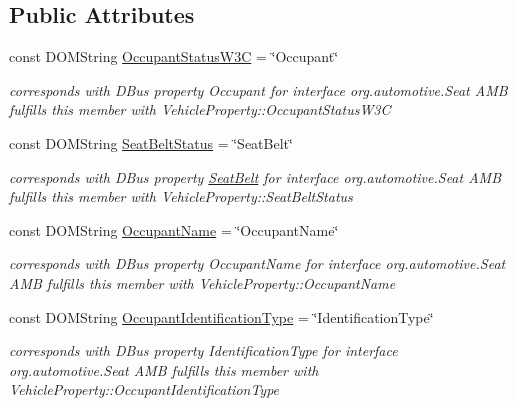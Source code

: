 \subsection*{Public Attributes}
\begin{DoxyCompactItemize}
\item 
\hypertarget{interfaceSeat_a9dfd71204222c0d59de76716120bff44}{const D\+O\+M\+String \hyperlink{interfaceSeat_a9dfd71204222c0d59de76716120bff44}{Occupant\+Status\+W3\+C} = \char`\"{}Occupant\char`\"{}}\label{interfaceSeat_a9dfd71204222c0d59de76716120bff44}

\begin{DoxyCompactList}\small\item\em corresponds with D\+Bus property Occupant for interface org.\+automotive.\+Seat A\+M\+B fulfills this member with Vehicle\+Property\+::\+Occupant\+Status\+W3\+C \end{DoxyCompactList}\item 
\hypertarget{interfaceSeat_a4ad0b531d1d20e3490f67ff56792a701}{const D\+O\+M\+String \hyperlink{interfaceSeat_a4ad0b531d1d20e3490f67ff56792a701}{Seat\+Belt\+Status} = \char`\"{}Seat\+Belt\char`\"{}}\label{interfaceSeat_a4ad0b531d1d20e3490f67ff56792a701}

\begin{DoxyCompactList}\small\item\em corresponds with D\+Bus property \hyperlink{interfaceSeatBelt}{Seat\+Belt} for interface org.\+automotive.\+Seat A\+M\+B fulfills this member with Vehicle\+Property\+::\+Seat\+Belt\+Status \end{DoxyCompactList}\item 
\hypertarget{interfaceSeat_afa5739cd2f418bbc28fa6a469706c8fa}{const D\+O\+M\+String \hyperlink{interfaceSeat_afa5739cd2f418bbc28fa6a469706c8fa}{Occupant\+Name} = \char`\"{}Occupant\+Name\char`\"{}}\label{interfaceSeat_afa5739cd2f418bbc28fa6a469706c8fa}

\begin{DoxyCompactList}\small\item\em corresponds with D\+Bus property Occupant\+Name for interface org.\+automotive.\+Seat A\+M\+B fulfills this member with Vehicle\+Property\+::\+Occupant\+Name \end{DoxyCompactList}\item 
\hypertarget{interfaceSeat_aac8ae80e32ed167cfd9275692fb0cee1}{const D\+O\+M\+String \hyperlink{interfaceSeat_aac8ae80e32ed167cfd9275692fb0cee1}{Occupant\+Identification\+Type} = \char`\"{}Identification\+Type\char`\"{}}\label{interfaceSeat_aac8ae80e32ed167cfd9275692fb0cee1}

\begin{DoxyCompactList}\small\item\em corresponds with D\+Bus property Identification\+Type for interface org.\+automotive.\+Seat A\+M\+B fulfills this member with Vehicle\+Property\+::\+Occupant\+Identification\+Type \end{DoxyCompactList}\end{DoxyCompactItemize}


